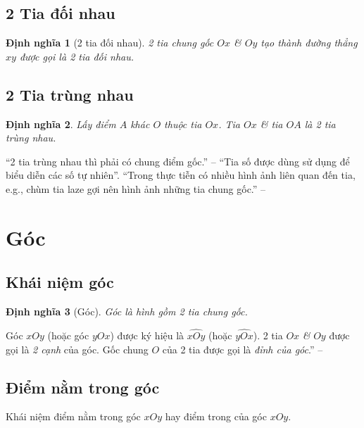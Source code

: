\documentclass[oneside]{book}
\numberwithin{equation}{section}
\newtheorem{dinhnghia}{Định nghĩa}[section]
\begin{document}
\subsection{2 Tia đối nhau}

\begin{dinhnghia}[2 tia đối nhau]
	2 tia chung gốc $Ox$ \textit{\&} $Oy$ tạo thành đường thẳng $xy$ được gọi là \emph{2 tia đối nhau}.
\end{dinhnghia}

\subsection{2 Tia trùng nhau}

\begin{dinhnghia}
	Lấy điểm $A$ khác $O$ thuộc tia $Ox$. Tia $Ox$ \textit{\&} tia $OA$ là \emph{2 tia trùng nhau}.
\end{dinhnghia}
``2 tia trùng nhau thì phải có chung điểm gốc.'' -- \cite[p. 91]{Thai_Anh_Dat_Ha_Loan_Nam_Quang_Toan_6_tap_2} ``Tia số được dùng sử dụng để biểu diễn các số tự nhiên''. ``Trong thực tiễn có nhiều hình ảnh liên quan đến tia, e.g., chùm tia laze gợi nên hình ảnh những tia chung gốc.'' -- \cite[p. 93]{Thai_Anh_Dat_Ha_Loan_Nam_Quang_Toan_6_tap_2}


\section{Góc}

\subsection{Khái niệm góc}

\begin{dinhnghia}[Góc]
	\emph{Góc} là hình gồm 2 tia chung gốc.
\end{dinhnghia}
Góc $xOy$  (hoặc góc $yOx$) được ký hiệu là $\widehat{xOy}$ (hoặc $\widehat{yOx}$). 2 tia $Ox$ \textit{\&} $Oy$ được gọi là \textit{2 cạnh} của góc. Gốc chung $O$ của 2 tia được gọi là \textit{đỉnh của góc}.'' -- \cite[p. 94]{Thai_Anh_Dat_Ha_Loan_Nam_Quang_Toan_6_tap_2}

\subsection{Điểm nằm trong góc}
Khái niệm điểm nằm trong góc $xOy$ hay điểm trong của góc $xOy$.
\end{document}
